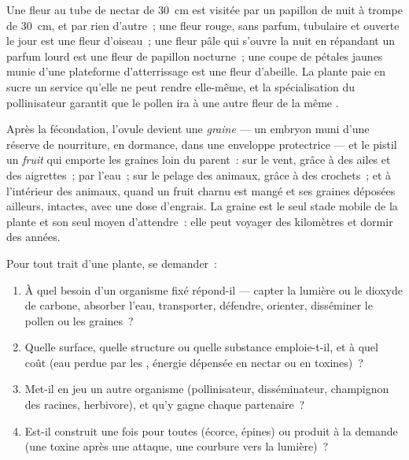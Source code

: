 \begin{example}\label{ex:g12:plant-rooted-life:match}
Une fleur au tube de nectar de \qty{30}{cm} est visitée par un
papillon de nuit à trompe de \qty{30}{cm}, et par rien d'autre~; une
fleur rouge, sans parfum, tubulaire et ouverte le jour est une fleur
d'oiseau~; une fleur pâle qui s'ouvre la nuit en répandant un parfum
lourd est une fleur de papillon nocturne~; une coupe de pétales jaunes
munie d'une plateforme d'atterrissage est une fleur d'abeille. La
plante paie en sucre un service qu'elle ne peut rendre elle-même, et
la spécialisation du pollinisateur garantit que le pollen ira à une
autre fleur de la même .
\end{example}

\begin{proposition}\label{prop:g12:plant-rooted-life:dispersal}
Après la fécondation, l'ovule devient une \emph{graine} --- un embryon
muni d'une réserve de nourriture, en dormance, dans une enveloppe
protectrice --- et le pistil un \emph{fruit} qui emporte les graines
loin du parent~: sur le vent, grâce à des ailes et des aigrettes~; par
l'eau~; sur le pelage des animaux, grâce à des crochets~; et à
l'intérieur des animaux, quand un fruit charnu est mangé et ses
graines déposées ailleurs, intactes, avec une dose d'engrais. La
graine est le seul stade mobile de la plante et son seul moyen
d'attendre~: elle peut voyager des kilomètres et dormir des années.
\end{proposition}
\admitted

\begin{method}\label{met:g12:plant-rooted-life:read}
Pour tout trait d'une plante, se demander~:
\begin{enumerate}
  \item À quel besoin d'un organisme fixé répond-il --- capter la
        lumière ou le dioxyde de carbone, absorber l'eau, transporter,
        défendre, orienter, disséminer le pollen ou les graines~?
  \item Quelle surface, quelle structure ou quelle substance
        emploie-t-il, et à quel coût (eau perdue par les ,
        énergie dépensée en nectar ou en toxines)~?
  \item Met-il en jeu un autre organisme (pollinisateur,
        disséminateur, champignon des racines, herbivore), et qu'y
        gagne chaque partenaire~?
  \item Est-il construit une fois pour toutes (écorce, épines) ou
        produit à la demande (une toxine après une attaque, une
        courbure vers la lumière)~?
\end{enumerate}
\end{method}

